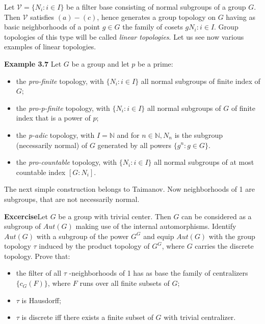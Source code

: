 \documentclass[12pt]{article}
\begin{document}
    Let $\mathcal{V} = \{N_i : i \in I\}$ be a filter base consisting of normal subgroups of a group $G$. Then $\mathcal{V}$ satisfies $(a)-(c)$,
hence generates a group topology on $G$ having as basic neighborhoods of a point $g \in G$ the family of cosets
${gN_i: i \in I}$. Group topologies of this type will be called \emph{linear topologies}. Let us see now various examples of
linear topologies.


\textbf{Example 3.7} Let $G$ be a group and let $p$ be a prime:


\begin{itemize}
    \item the \emph{pro-finite} topology, with $\{N_i : i \in I\}$ all normal subgroups of finite index of $G$;
    
    \item the \emph{pro-p-finite} topology, with $\{N_i : i \in I\}$ all normal subgroups of $G$ of finite index that is a power of $p$;

    \item the \emph{p-adic} topology, with $I = \mathbb{N}$ and for $n \in \mathbb{N}, N_n$ is the subgroup (necessarily normal)
        of $G$ generated by all powers $\{g^n : g \in G\}$.

    \item the \emph{pro-countable} topology, with $\{N_i : i \in I\}$ all normal subgroups of at most countable index $[G : N_i]$.

\end{itemize}


The next simple construction belongs to Taimanov. Now neighborhoods of 1 are subgroups, that are not necessarily normal.

\textbf{Excercise}Let $G$ be a group with trivial center. Then $G$ can be considered as a subgroup of $Aut (G)$ making
    use of the internal automorphisms. Identify $Aut (G)$ with a subgroup of the power $G^G$ and equip $Aut (G)$ with
    the group topology $\tau$ induced by the product topology of $G^G$, where $G$ carries the discrete topology. Prove that:


    \begin{itemize}

        \item the filter of all $\tau$ -neighborhoods of 1 has as base the family of centralizers $\{c_G(F)\}$, where $F$ runs over all
        finite subsets of $G$;
        
        \item $\tau$ is Hausdorff;
        
        \item $\tau$ is discrete iff there exists a finite subset of $G$ with trivial centralizer.

    \end{itemize}
\end{document}
